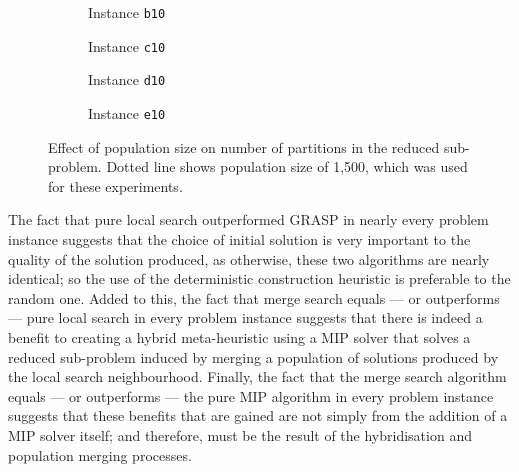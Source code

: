 \documentclass[journal]{IEEEtran}
\begin{document}
%
\begin{center}
\begin{figure}[ht]
    \centering
    \begin{subfigure}[t]{0.23\textwidth}
    \centering
    \caption{Instance \texttt{b10}}
    \label{fig:stpg_pop.1}
    \end{subfigure}
    \quad
    \begin{subfigure}[t]{0.23\textwidth}
    \centering
    \caption{Instance \texttt{c10}}
    \label{fig:stpg_pop.2}
    \end{subfigure}
    \quad
    \begin{subfigure}[t]{0.23\textwidth}
    \centering
    \caption{Instance \texttt{d10}}
    \label{fig:stpg_pop.3}
    \end{subfigure}
    \quad 
    \begin{subfigure}[t]{0.23\textwidth}
    \centering
    \caption{Instance \texttt{e10}}
    \label{fig:stpg_pop.4}
    \end{subfigure}
    \caption[Effect of population size on number of partitions in the reduced sub-problem]{Effect of population size on number of partitions in the reduced sub-problem. Dotted line shows population size of 1,500, which was used for these experiments.} 
    \label{fig:stpg_pop_plots}
\end{figure}
\end{center}
%

The fact that pure local search outperformed GRASP in nearly every problem instance suggests that the choice of initial solution is very important to the quality of the solution produced, as otherwise, these two algorithms are nearly identical; so the use of the deterministic construction heuristic is preferable to the random one. Added to this, the fact that merge search equals --- or outperforms --- pure local search in every problem instance suggests that there is indeed a benefit to creating a hybrid meta-heuristic using a MIP solver that solves a reduced sub-problem induced by merging a population of solutions produced by the local search neighbourhood. Finally, the fact that the merge search algorithm equals --- or outperforms --- the pure MIP algorithm in every problem instance suggests that these benefits that are gained are not simply from the addition of a MIP solver itself; and therefore, must be the result of the hybridisation and population merging processes.
\end{document}
